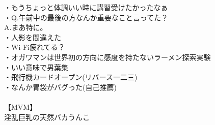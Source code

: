 ・もうちょっと体調いい時に講習受けたかったなぁ\\
・Q.午前中の最後の方なんか重要なこと言ってた？\\
    A.まあ特に。\\
・人影を間違えた\\
・Wi-Fi疲れてる？\\
・オガワマンは世界初の方向に感度を持たないラーメン探索実験\\
・いい意味で男葉集\\
・飛行機カードオープン(リバース一二三)\\
・なんか胃袋がバグった(自己推薦)\\
 \\
【MVM】\\
淫乱巨乳の天然バカうんこ\\

\newpage
